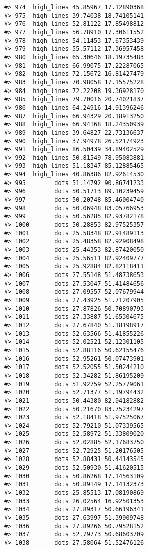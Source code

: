 \documentclass[
]{book}
\theoremstyle{definition}
\theoremstyle{definition}
\theoremstyle{definition}
\theoremstyle{definition}
\theoremstyle{remark}
\begin{document}
\begin{verbatim}
#> 974  high_lines 45.85967 17.12890368
#> 975  high_lines 39.74038 18.74105141
#> 976  high_lines 52.81122 17.85498812
#> 977  high_lines 56.78910 17.30611552
#> 978  high_lines 54.11453 17.67353439
#> 979  high_lines 55.57112 17.36957458
#> 980  high_lines 65.30646 18.19735483
#> 981  high_lines 66.99075 17.22287065
#> 982  high_lines 72.15672 16.81427479
#> 983  high_lines 70.98058 17.15575228
#> 984  high_lines 72.22208 19.36928170
#> 985  high_lines 79.70016 20.74021837
#> 986  high_lines 64.24916 14.91396246
#> 987  high_lines 66.94329 20.18913250
#> 988  high_lines 66.94168 18.24350939
#> 989  high_lines 39.64827 22.73136637
#> 990  high_lines 37.94978 26.52174923
#> 991  high_lines 86.50439 34.89402529
#> 992  high_lines 50.81549 78.95083881
#> 993  high_lines 51.18347 85.12885465
#> 994  high_lines 40.86386 82.92614530
#> 995        dots 51.14792 90.86741233
#> 996        dots 50.51713 89.10239459
#> 997        dots 50.20748 85.46004740
#> 998        dots 50.06948 83.05766953
#> 999        dots 50.56285 82.93782178
#> 1000       dots 50.28853 82.97525357
#> 1001       dots 25.58348 82.91489113
#> 1002       dots 25.48358 82.92908498
#> 1003       dots 25.44353 82.87420050
#> 1004       dots 25.56511 82.92409777
#> 1005       dots 25.92884 82.82118411
#> 1006       dots 27.55148 51.48738653
#> 1007       dots 27.53047 51.41484656
#> 1008       dots 27.09557 52.07679944
#> 1009       dots 27.43925 51.71207905
#> 1010       dots 27.87826 50.70890793
#> 1011       dots 27.33887 51.65304675
#> 1012       dots 27.67840 51.18198917
#> 1013       dots 52.63566 51.41855226
#> 1014       dots 52.02521 52.12301105
#> 1015       dots 52.88116 50.62155476
#> 1016       dots 52.95261 50.07473901
#> 1017       dots 52.52055 51.50244210
#> 1018       dots 52.34282 51.86195209
#> 1019       dots 51.92759 52.25779061
#> 1020       dots 52.71377 51.19794432
#> 1021       dots 50.44380 82.94182882
#> 1022       dots 50.21670 83.75234297
#> 1023       dots 52.18418 51.97525067
#> 1024       dots 52.79210 51.07339565
#> 1025       dots 52.58972 51.33809020
#> 1026       dots 52.02885 52.17683750
#> 1027       dots 52.72925 51.20176505
#> 1028       dots 52.88431 50.44143545
#> 1029       dots 52.50930 51.41620515
#> 1030       dots 50.86268 17.14563109
#> 1031       dots 50.89149 17.14132373
#> 1032       dots 25.85513 17.08190869
#> 1033       dots 26.02564 16.92501353
#> 1034       dots 27.89317 50.66196341
#> 1035       dots 27.63997 51.39909748
#> 1036       dots 27.89266 50.79528152
#> 1037       dots 52.79773 50.68603709
#> 1038       dots 27.58064 51.52476126

\end{verbatim}
\end{document}
